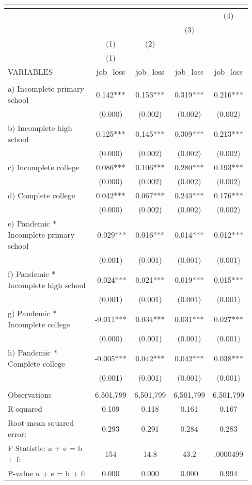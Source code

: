 \begin{tabular}{lcccc}
\multicolumn{5}{c}{} \\ \hline
 &  &  &  & (4) \\
 &  &  & (3) &  \\
 & (1) & (2) &  &  \\
 & (1) &  &  &  \\
VARIABLES & job\_loss & job\_loss & job\_loss & job\_loss \\ \hline
 &  &  &  &  \\
a) Incomplete primary school & 0.142*** & 0.153*** & 0.319*** & 0.216*** \\
 & (0.000) & (0.002) & (0.002) & (0.002) \\
b) Incomplete high school & 0.125*** & 0.145*** & 0.309*** & 0.213*** \\
 & (0.000) & (0.002) & (0.002) & (0.002) \\
c) Incomplete college & 0.086*** & 0.106*** & 0.280*** & 0.193*** \\
 & (0.000) & (0.002) & (0.002) & (0.002) \\
d) Complete college & 0.042*** & 0.067*** & 0.243*** & 0.176*** \\
 & (0.000) & (0.002) & (0.002) & (0.002) \\
e) Pandemic * Incomplete primary school & -0.029*** & 0.016*** & 0.014*** & 0.012*** \\
 & (0.001) & (0.001) & (0.001) & (0.001) \\
f) Pandemic * Incomplete high school & -0.024*** & 0.021*** & 0.019*** & 0.015*** \\
 & (0.001) & (0.001) & (0.001) & (0.001) \\
g) Pandemic * Incomplete college & -0.011*** & 0.034*** & 0.031*** & 0.027*** \\
 & (0.000) & (0.001) & (0.001) & (0.001) \\
h) Pandemic * Complete college & -0.005*** & 0.042*** & 0.042*** & 0.038*** \\
 & (0.001) & (0.001) & (0.001) & (0.001) \\
 &  &  &  &  \\
Observations & 6,501,799 & 6,501,799 & 6,501,799 & 6,501,799 \\
R-squared & 0.109 & 0.118 & 0.161 & 0.167 \\
Root mean squared error: & 0.293 & 0.291 & 0.284 & 0.283 \\
F Statistic: a + e = b + f: & 154 & 14.8 & 43.2 & .0000499 \\
\hspace{1mm} P-value a + e = b + f: & 0.000 & 0.000 & 0.000 & 0.994 \\

\end{tabular}
